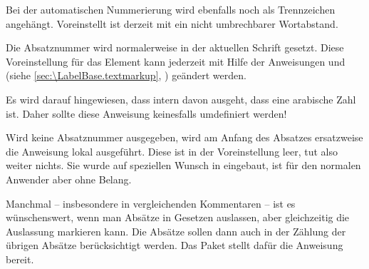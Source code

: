 Bei der automatischen Nummerierung wird
 ebenfalls noch  als Trennzeichen
angehängt. Voreinstellt ist derzeit mit
 ein nicht umbrechbarer
Wortabstand.

%
Die Absatznummer wird normalerweise in der
aktuellen Schrift gesetzt. Diese Voreinstellung für das Element
 kann jederzeit mit Hilfe der Anweisungen
%
 und
 (siehe
\autoref{sec:\LabelBase.textmarkup}, )
geändert werden.%
%

Es wird darauf hingewiesen, dass  intern
davon ausgeht, dass  eine arabische Zahl ist. Daher sollte
diese Anweisung keinesfalls umdefiniert werden!%
\EndIndexGroup


\begin{Declaration}
\end{Declaration}
Wird keine Absatznummer ausgegeben, wird am Anfang des Absatzes ersatzweise
die Anweisung  lokal
ausgeführt. Diese ist in der Voreinstellung leer, tut
also weiter nichts. Sie wurde auf speziellen Wunsch in 
eingebaut, ist für den normalen Anwender aber ohne Belang.%
\EndIndexGroup


\begin{Declaration}
\end{Declaration}
Manchmal -- insbesondere in vergleichenden
Kommentaren -- ist es wünschenswert, wenn man Absätze in Gesetzen auslassen,
aber gleichzeitig die Auslassung markieren kann. Die
Absätze sollen dann auch in der Zählung der übrigen Absätze berücksichtigt
werden. Das Paket  stellt dafür die Anweisung
 bereit. 

